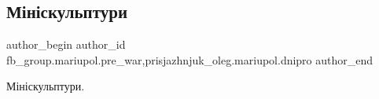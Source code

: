  
 
 
 
 

\subsection{Мініскульптури}
\label{sec:20_01_2023.fb.fb_group.mariupol.pre_war.6.miniskulptury_nilsen}
 
\ifcmt
 author_begin
   author_id fb_group.mariupol.pre_war,prisjazhnjuk_oleg.mariupol.dnipro
 author_end
\fi

Мініскульптури.

